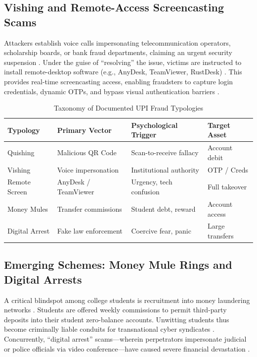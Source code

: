 \documentclass[journal,10pt,twocolumn]{IEEEtran}
\begin{document}
\subsection{Vishing and Remote-Access Screencasting Scams}
Attackers establish voice calls impersonating telecommunication operators, scholarship boards, or bank fraud departments, claiming an urgent security suspension \cite{mukhopadhyay2024}. Under the guise of ``resolving'' the issue, victims are instructed to install remote-desktop software (e.g., AnyDesk, TeamViewer, RustDesk) \cite{jify2026, systems2024}. This provides real-time screencasting access, enabling fraudsters to capture login credentials, dynamic OTPs, and bypass visual authentication barriers \cite{jify2026}.

\begin{table}[htbp]
\caption{Taxonomy of Documented UPI Fraud Typologies}
\label{tab:typology}
\centering
\begin{tabularx}{\columnwidth}{lXXl}
\toprule
\textbf{Typology} & \textbf{Primary Vector} & \textbf{Psychological Trigger} & \textbf{Target Asset} \\
\midrule
Quishing \cite{anivicus2026, bajaj2026} & Malicious QR Code & Scan-to-receive fallacy & Account debit \\
Vishing \cite{mukhopadhyay2024} & Voice impersonation & Institutional authority & OTP / Creds \\
Remote Screen \cite{jify2026} & AnyDesk / TeamViewer & Urgency, tech confusion & Full takeover \\
Money Mules \cite{mukhopadhyay2024} & Transfer commissions & Student debt, reward & Account access \\
Digital Arrest \cite{systems2024} & Fake law enforcement & Coercive fear, panic & Large transfers \\
\bottomrule
\end{tabularx}
\end{table}

\subsection{Emerging Schemes: Money Mule Rings and Digital Arrests}
A critical blindspot among college students is recruitment into money laundering networks \cite{mukhopadhyay2024}. Students are offered weekly commissions to permit third-party deposits into their student zero-balance accounts. Unwitting students thus become criminally liable conduits for transnational cyber syndicates \cite{mukhopadhyay2024, pib_curbing2026}. Concurrently, ``digital arrest'' scams---wherein perpetrators impersonate judicial or police officials via video conference---have caused severe financial devastation \cite{systems2024}.
\end{document}
